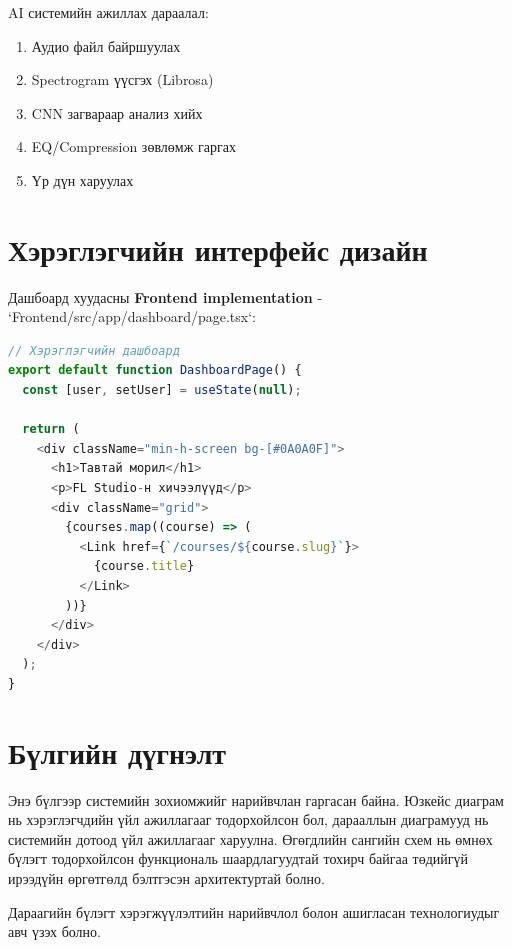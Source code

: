 AI системийн ажиллах дараалал:

\begin{enumerate}
    \item Аудио файл байршуулах
    \item Spectrogram үүсгэх (Librosa)
    \item CNN загвараар анализ хийх
    \item EQ/Compression зөвлөмж гаргах
    \item Үр дүн харуулах
\end{enumerate}

\section{Хэрэглэгчийн интерфейс дизайн}

Дашбоард хуудасны \textbf{Frontend implementation} - `Frontend/src/app/dashboard/page.tsx`:

\begin{lstlisting}[language=JavaScript]
// Хэрэглэгчийн дашбоард
export default function DashboardPage() {
  const [user, setUser] = useState(null);
  
  return (
    <div className="min-h-screen bg-[#0A0A0F]">
      <h1>Тавтай морил</h1>
      <p>FL Studio-н хичээлүүд</p>
      <div className="grid">
        {courses.map((course) => (
          <Link href={`/courses/${course.slug}`}>
            {course.title}
          </Link>
        ))}
      </div>
    </div>
  );
}
\end{lstlisting}

\section{Бүлгийн дүгнэлт}

Энэ бүлгээр системийн зохиомжийг нарийвчлан гаргасан байна. Юзкейс диаграм нь хэрэглэгчдийн үйл ажиллагааг тодорхойлсон бол, дарааллын диаграмууд нь системийн дотоод үйл ажиллагааг харуулна. Өгөгдлийн сангийн схем нь өмнөх бүлэгт тодорхойлсон функциональ шаардлагуудтай тохирч байгаа төдийгүй ирээдүйн өргөтгөлд бэлтгэсэн архитектуртай болно.

Дараагийн бүлэгт хэрэгжүүлэлтийн нарийвчлол болон ашигласан технологиудыг авч үзэх болно.
